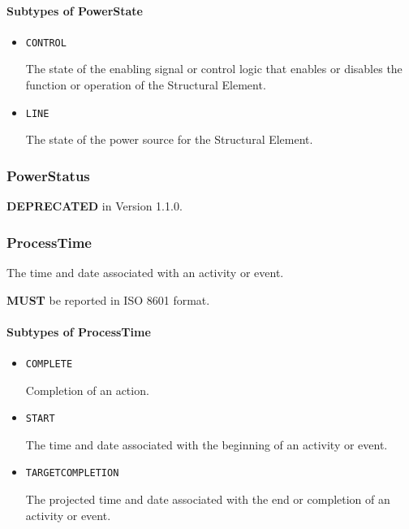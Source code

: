 \FloatBarrier

\paragraph{Subtypes of PowerState}\mbox{}
\label{sec:Subtypes of PowerState}

\begin{itemize}

\item \texttt{CONTROL}


The state of the enabling signal or control logic that enables or disables the function or operation of the \gls{Structural Element}.

\item \texttt{LINE}


The state of the power source for the \gls{Structural Element}.


\end{itemize}

\subsubsection{PowerStatus}
\label{sec:PowerStatus}



\textbf{DEPRECATED} in Version 1.1.0.


\subsubsection{ProcessTime}
\label{sec:ProcessTime}



The time and date associated with an activity or event.
  
  \textbf{MUST} be reported in ISO 8601 format.


\paragraph{Subtypes of ProcessTime}\mbox{}
\label{sec:Subtypes of ProcessTime}

\begin{itemize}

\item \texttt{COMPLETE}


Completion of an action.

\item \texttt{START}


The time and date associated with the beginning of an activity or event.

\item \texttt{TARGET\textunderscore COMPLETION}


The projected time and date associated with the end or completion of an activity or event.


\end{itemize}

